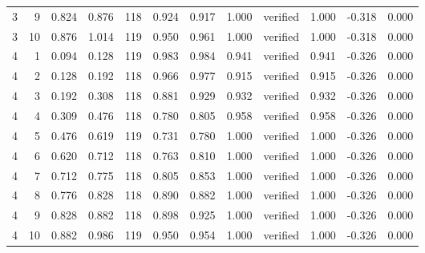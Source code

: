 \begin{tabular}{rrrrrrrrlrrr}
3 & 9 & 0.824 & 0.876 & 118 & 0.924 & 0.917 & 1.000 & verified & 1.000 & -0.318 & 0.000 \\
3 & 10 & 0.876 & 1.014 & 119 & 0.950 & 0.961 & 1.000 & verified & 1.000 & -0.318 & 0.000 \\
4 & 1 & 0.094 & 0.128 & 119 & 0.983 & 0.984 & 0.941 & verified & 0.941 & -0.326 & 0.000 \\
4 & 2 & 0.128 & 0.192 & 118 & 0.966 & 0.977 & 0.915 & verified & 0.915 & -0.326 & 0.000 \\
4 & 3 & 0.192 & 0.308 & 118 & 0.881 & 0.929 & 0.932 & verified & 0.932 & -0.326 & 0.000 \\
4 & 4 & 0.309 & 0.476 & 118 & 0.780 & 0.805 & 0.958 & verified & 0.958 & -0.326 & 0.000 \\
4 & 5 & 0.476 & 0.619 & 119 & 0.731 & 0.780 & 1.000 & verified & 1.000 & -0.326 & 0.000 \\
4 & 6 & 0.620 & 0.712 & 118 & 0.763 & 0.810 & 1.000 & verified & 1.000 & -0.326 & 0.000 \\
4 & 7 & 0.712 & 0.775 & 118 & 0.805 & 0.853 & 1.000 & verified & 1.000 & -0.326 & 0.000 \\
4 & 8 & 0.776 & 0.828 & 118 & 0.890 & 0.882 & 1.000 & verified & 1.000 & -0.326 & 0.000 \\
4 & 9 & 0.828 & 0.882 & 118 & 0.898 & 0.925 & 1.000 & verified & 1.000 & -0.326 & 0.000 \\
4 & 10 & 0.882 & 0.986 & 119 & 0.950 & 0.954 & 1.000 & verified & 1.000 & -0.326 & 0.000 \\
\bottomrule
\end{tabular}
